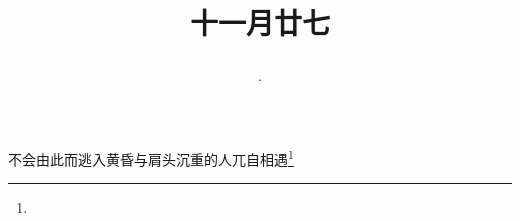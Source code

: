 \title{\date[d=8,m=1,y=2024][year:cn-y,年,month:cn,day:cn,日,·,weekday]·十一月廿七 }
不会由此而逃入黄昏与肩头沉重的人兀自相遇\footnote{ }

